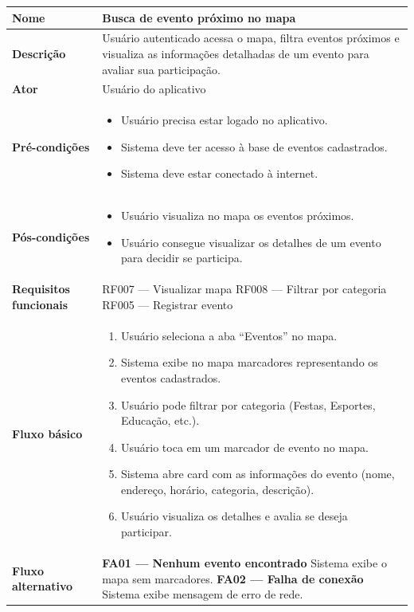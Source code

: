 \begin{longtable}{|p{4cm}|p{10cm}|}
  \hline
  \textbf{Nome} & Busca de evento próximo no mapa \\
  \hline
  \textbf{Descrição} & Usuário autenticado acessa o mapa, filtra eventos próximos e visualiza as informações detalhadas de um evento para avaliar sua participação. \\
  \hline
  \textbf{Ator} & Usuário do aplicativo \\
  \hline
  \textbf{Pré-condições} &
    \begin{itemize}
      \item Usuário precisa estar logado no aplicativo.
      \item Sistema deve ter acesso à base de eventos cadastrados.
      \item Sistema deve estar conectado à internet.
    \end{itemize} \\
  \hline
  \textbf{Pós-condições} &
    \begin{itemize}
      \item Usuário visualiza no mapa os eventos próximos.
      \item Usuário consegue visualizar os detalhes de um evento para decidir se participa.
    \end{itemize} \\
  \hline
  \textbf{Requisitos funcionais} & RF007 — Visualizar mapa \newline RF008 — Filtrar por categoria \newline RF005 — Registrar evento \\
  \hline
  \textbf{Fluxo básico} &
    \begin{enumerate}
      \item Usuário seleciona a aba ``Eventos'' no mapa.
      \item Sistema exibe no mapa marcadores representando os eventos cadastrados.
      \item Usuário pode filtrar por categoria (Festas, Esportes, Educação, etc.).
      \item Usuário toca em um marcador de evento no mapa.
      \item Sistema abre card com as informações do evento (nome, endereço, horário, categoria, descrição).
      \item Usuário visualiza os detalhes e avalia se deseja participar.
    \end{enumerate} \\
  \hline
  \textbf{Fluxo alternativo} & \textbf{FA01 — Nenhum evento encontrado} \newline
    Sistema exibe o mapa sem marcadores. \newline\newline
    \textbf{FA02 — Falha de conexão} \newline
    Sistema exibe mensagem de erro de rede. \\
  \hline
\end{longtable}

